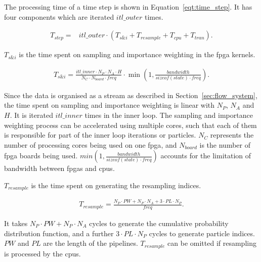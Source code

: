 The processing time of a time step is shown in Equation~\ref{eqt:time_step}.
It has four components which are iterated $itl\_outer$ times.

\begin{equation}
\begin{aligned}
T_{step} = & itl\_outer \cdot \left (T_{s\&i} + T_{resample} + T_{cpu} + T_{tran} \right) \mbox{.}
\end{aligned}
\label{eqt:time_step}
\end{equation}
 
$T_{s\&i}$ is the time spent on sampling and importance weighting in the \gls{fpga} kernels.

\begin{equation}
\begin{aligned}
T_{s\&i} = \frac{itl\_inner \cdot N_P \cdot N_A \cdot H}{N_C \cdot N_{board} \cdot freq} \cdot \min\left(1,\frac{bandwidth}{sizeof(state) \cdot freq}\right) \mbox{.}
\end{aligned}
\end{equation}

Since the data is organised as a stream as described in Section~\ref{sec:flow_system}, the time spent on sampling and importance weighting is linear with $N_P$, $N_A$ and $H$.
It is iterated $itl\_inner$ times in the inner loop.
The sampling and importance weighting process can be accelerated using multiple cores, such that each of them is responsible for part of the inner loop iterations or particles.
$N_C$ represents the number of processing cores being used on one \gls{fpga}, and $N_{board}$ is the number of \gls{fpga} boards being used.
$min(1,\frac{bandwidth}{sizeof(state) \cdot freq})$ accounts for the limitation of bandwidth between \glspl{fpga} and \glspl{cpu}.

$T_{resample}$ is the time spent on generating the resampling indices.

\begin{equation}
\begin{aligned}
T_{resample} = \frac{N_P \cdot PW + N_P \cdot N_A + 3 \cdot PL \cdot N_P}{freq} \mbox{.}
\end{aligned}
\end{equation}

It takes $N_P \cdot PW + N_P \cdot N_A$ cycles to generate the cumulative probability distribution function, and a further $3 \cdot PL \cdot N_P$ cycles to generate particle indices.
$PW$ and $PL$ are the length of the pipelines.
$T_{resample}$ can be omitted if resampling is processed by the \glspl{cpu}.

